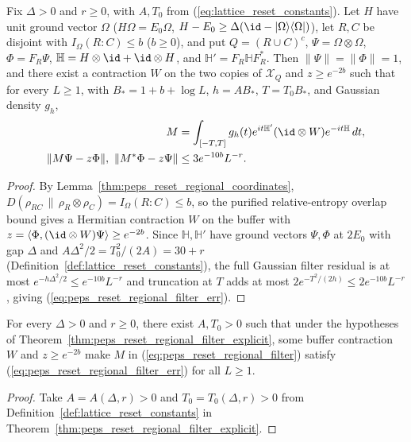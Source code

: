 \begin{theorem}
    \label{thm:peps_reset_regional_filter_explicit}
    \leanok
    Fix $\Delta>0$ and $r\geq0$, with $A,T_0$ from (\ref{eq:lattice_reset_constants}). Let $H$ have unit ground vector $\Omega$ ($H\Omega=E_0\Omega$, $H-E_0\geq\Delta(\id-|\Omega\rangle\langle\Omega|)$), let $R,C$ be disjoint with $I_\Omega(R:C)\leq b$ ($b\geq0$), and put $Q=(R\cup C)^c$, $\Psi=\Omega\otimes\Omega$, $\Phi=F_R\Psi$, $\mathbb H=H\otimes\id+\id\otimes H$, and $\mathbb H'=F_R\mathbb HF_R^*$. Then $\|\Psi\|=\|\Phi\|=1$, and there exist a contraction $W$ on the two copies of $\mathcal X_Q$ and $z\geq e^{-2b}$ such that for every $L\geq1$, with $B_*=1+b+\log L$, $h=AB_*$, $T=T_0B_*$, and Gaussian density $g_h$,
    \begin{align}
        M                                   & =\int_{[-T,T]}g_h(t)e^{it\mathbb H'}(\id\otimes W)e^{-it\mathbb H}\,dt, \label{eq:peps_reset_regional_filter} \\
        \|M\Psi-z\Phi\|,\ \|M^*\Phi-z\Psi\| & \le3e^{-10b}L^{-r}. \label{eq:peps_reset_regional_filter_err}
    \end{align}
\end{theorem}
\begin{proof}
    \leanok
    By Lemma~\ref{thm:peps_reset_regional_coordinates}, $D(\rho_{RC}\,\|\,\rho_R\otimes\rho_C)=I_\Omega(R:C)\le b$, so the purified relative-entropy overlap bound gives a Hermitian contraction $W$ on the buffer with $z=\langle\Phi,(\id\otimes W)\Psi\rangle\ge e^{-2b}$. Since $\mathbb H,\mathbb H'$ have ground vectors $\Psi,\Phi$ at $2E_0$ with gap $\Delta$ and $A\Delta^2/2=T_0^2/(2A)=30+r$ (Definition~\ref{def:lattice_reset_constants}), the full Gaussian filter residual is at most $e^{-h\Delta^2/2}\le e^{-10b}L^{-r}$ and truncation at $T$ adds at most $2e^{-T^2/(2h)}\le 2e^{-10b}L^{-r}$, giving (\ref{eq:peps_reset_regional_filter_err}).
\end{proof}

\begin{corollary}
    \label{thm:peps_reset_regional_filter}
    \leanok
    For every $\Delta>0$ and $r\ge0$, there exist $A,T_0>0$ such that under the hypotheses of Theorem~\ref{thm:peps_reset_regional_filter_explicit}, some buffer contraction $W$ and $z\ge e^{-2b}$ make $M$ in (\ref{eq:peps_reset_regional_filter}) satisfy (\ref{eq:peps_reset_regional_filter_err}) for all $L\ge1$.
\end{corollary}
\begin{proof}
    \leanok
    Take $A=A(\Delta,r)>0$ and $T_0=T_0(\Delta,r)>0$ from Definition~\ref{def:lattice_reset_constants} in Theorem~\ref{thm:peps_reset_regional_filter_explicit}.
\end{proof}

